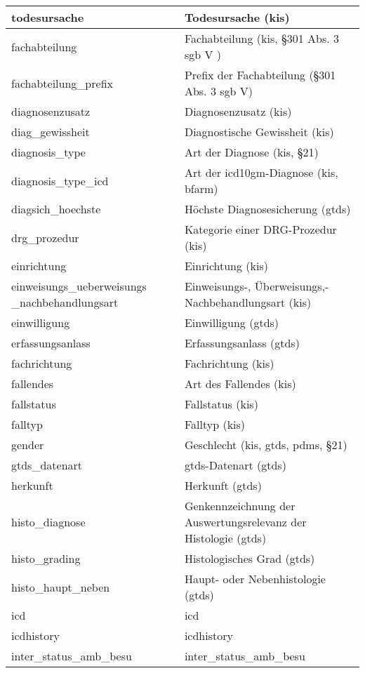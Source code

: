 \begin{longtable}{||p{5.3cm}|p{8.5cm}||}
  	todesursache & Todesursache (\ac{kis}) \\ \hline
  	fachabteilung & Fachabteilung (\ac{kis}, \S 301 Abs. 3 \acs{sgb} V ) \\ \hline
  	fachabteilung\_prefix & Prefix der Fachabteilung (\S 301 Abs. 3 \acs{sgb} V)\\ \hline
  	diagnosenzusatz & Diagnosenzusatz (\ac{kis}) \\ \hline
  	diag\_gewissheit & Diagnostische Gewissheit (\ac{kis}) \\ \hline
  	diagnosis\_type & Art der Diagnose (\ac{kis}, \S 21) \\ \hline
  	diagnosis\_type\_icd & Art der \acs{icd10gm}-Diagnose (\ac{kis}, \acs{bfarm})\\ \hline
  	diagsich\_hoechste & Höchste Diagnosesicherung (\ac{gtds})\\ \hline
  	drg\_prozedur & Kategorie einer DRG-Prozedur (\ac{kis})\\ \hline
  	einrichtung & Einrichtung (\ac{kis})\\ \hline
  	einweisungs\_ueberweisungs \_nachbehandlungsart & Einweisungs-, Überweisungs,- Nachbehandlungsart (\ac{kis})\\ \hline
  	einwilligung & Einwilligung (\ac{gtds})\\ \hline
  	erfassungsanlass & Erfassungsanlass (\ac{gtds}) \\ \hline
  	fachrichtung & Fachrichtung (\ac{kis})\\ \hline
  	fallendes & Art des Fallendes (\ac{kis})\\ \hline
  	fallstatus & Fallstatus (\ac{kis})\\ \hline
  	falltyp & Falltyp (\ac{kis})\\ \hline
  	gender & Geschlecht (\ac{kis}, \ac{gtds}, \ac{pdms}, \S 21)\\ \hline
  	gtds\_datenart & \ac{gtds}-Datenart (\ac{gtds})\\ \hline
  	herkunft & Herkunft (\ac{gtds})\\ \hline
  	histo\_diagnose & Genkennzeichnung der Auswertungsrelevanz der Histologie  (\ac{gtds})\\ \hline
  	histo\_grading & Histologisches Grad (\ac{gtds})\\ \hline
  	histo\_haupt\_neben & Haupt- oder Nebenhistologie (\ac{gtds})\\ \hline
  	icd & icd\\ \hline
  	icdhistory & icdhistory\\ \hline
  	inter\_status\_amb\_besu & inter\_status\_amb\_besu\\ \hline

\end{longtable}
